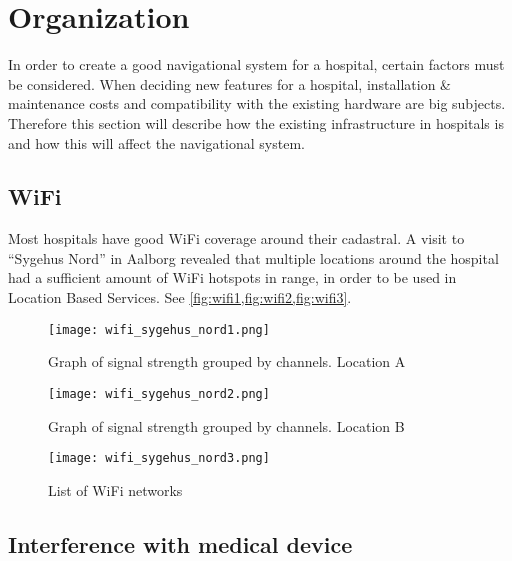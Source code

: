 \section{Organization} %
\label{sec:organization}




In order to create a good navigational system for a hospital, certain factors must be considered. When deciding new features for a hospital, installation \& maintenance costs and compatibility with the existing hardware are big subjects. Therefore this section will describe how the existing infrastructure in hospitals is and how this will affect the navigational system.

\subsection{WiFi}

Most hospitals have good WiFi coverage around their cadastral. A visit to \enquote{Sygehus Nord} in Aalborg revealed that multiple locations around the hospital had a sufficient amount of WiFi hotspots in range, in order to be used in Location Based Services. See \cref{fig:wifi1,fig:wifi2,fig:wifi3}.

\begin{figure}
\centering
  \begin{minipage}{0.45\textwidth}
    \centering
    \texttt{[image: wifi\_sygehus\_nord1.png]}
    \caption{Graph of signal strength grouped by channels. Location A} \label{fig:wifi1}
  \end{minipage}
  \hfill
  \begin{minipage}{0.45\textwidth}
    \centering
    \texttt{[image: wifi\_sygehus\_nord2.png]}
    \caption{Graph of signal strength grouped by channels. Location B} \label{fig:wifi2}
  \end{minipage}
    \begin{minipage}{0.45\textwidth}
    \centering
    \texttt{[image: wifi\_sygehus\_nord3.png]}
    \caption{List of WiFi networks} \label{fig:wifi3}
  \end{minipage}
  \end{figure}


\subsection{Interference with medical device}


